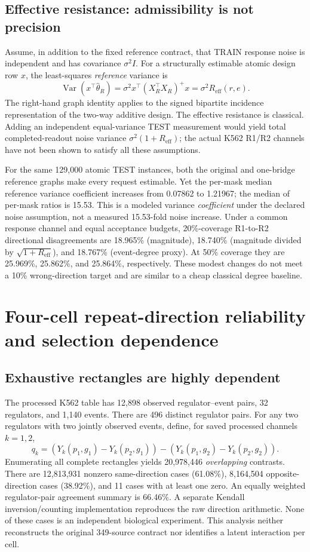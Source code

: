 \subsection{Effective resistance: admissibility is not precision}
Assume, in addition to the fixed reference contract, that TRAIN response noise is independent and has covariance $\sigma^2I$. For a structurally estimable atomic design row $x$, the least-squares \emph{reference} variance is
\begin{equation}
\operatorname{Var}(x^\top\widehat\theta_R)=\sigma^2 x^\top (X_R^\top X_R)^+x=\sigma^2R_{\mathrm{eff}}(r,e).
\label{eq:reff-s}
\end{equation}
The right-hand graph identity applies to the signed bipartite incidence representation of the two-way additive design. The effective resistance is classical. Adding an independent equal-variance TEST measurement would yield total completed-readout noise variance $\sigma^2(1+R_{\mathrm{eff}})$; the actual K562 R1/R2 channels have not been shown to satisfy all these assumptions.

For the same 129,000 atomic TEST instances, both the original and one-bridge reference graphs make every request estimable. Yet the per-mask median reference variance coefficient increases from 0.07862 to 1.21967; the median of per-mask ratios is 15.53. This is a modeled variance \emph{coefficient} under the declared noise assumption, not a measured 15.53-fold noise increase. Under a common response channel and equal acceptance budgets, 20\%-coverage R1-to-R2 directional disagreements are 18.965\% (magnitude), 18.740\% (magnitude divided by $\sqrt{1+R_{\mathrm{eff}}}$), and 18.767\% (event-degree proxy). At 50\% coverage they are 25.969\%, 25.862\%, and 25.864\%, respectively. These modest changes do not meet a 10\% wrong-direction target and are similar to a cheap classical degree baseline.

\section{Four-cell repeat-direction reliability and selection dependence}
\label{supp:q4}
\subsection{Exhaustive rectangles are highly dependent}
The processed K562 table has 12,898 observed regulator--event pairs, 32 regulators, and 1,140 events. There are 496 distinct regulator pairs. For any two regulators with two jointly observed events, define, for saved processed channels $k=1,2$,
\[
q_k=(Y_k(p_1,g_1)-Y_k(p_2,g_1))-(Y_k(p_1,g_2)-Y_k(p_2,g_2)).
\]
Enumerating all complete rectangles yields 20,978,446 \emph{overlapping} contrasts. There are 12,813,931 nonzero same-direction cases (61.08\%), 8,164,504 opposite-direction cases (38.92\%), and 11 cases with at least one zero. An equally weighted regulator-pair agreement summary is 66.46\%. A separate Kendall inversion/counting implementation reproduces the raw direction arithmetic. None of these cases is an independent biological experiment. This analysis neither reconstructs the original 349-source contract nor identifies a latent interaction per cell.

